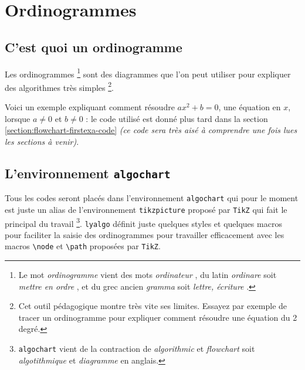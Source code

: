 \documentclass[12pt,a4paper]{article}
\theoremstyle{definition}
\newcommand\myquote[1]{{\itshape \og #1 \fg}}
\begin{document}
\section{Ordinogrammes}

\subsection{C'est quoi un ordinogramme} \label{section:flowchart-firstexa}

Les ordinogrammes
\footnote{
    Le mot \myquote{ordinogramme} vient des mots \myquote{ordinateur}, du latin \myquote{ordinare} soit \myquote{mettre en ordre}, et du grec ancien \myquote{gramma} soit \myquote{lettre, écriture}.
}
sont des diagrammes que l'on peut utiliser pour expliquer des algorithmes très simples
\footnote{
    Cet outil pédagogique montre très vite ses limites. Essayez par exemple de tracer un ordinogramme pour expliquer comment résoudre une équation du 2\ieme{} degré.
}.

\medskip


Voici un exemple expliquant comment résoudre $a x^2 + b = 0$, une équation en $x$, lorsque $a \neq 0$ et $b \neq 0$ : le code utilisé est donné plus tard dans la section \ref{section:flowchart-firstexa-code} \emph{(ce code sera très aisé à comprendre une fois lues les sections à venir)}.

\begin{center}
    \small
    
\end{center}




\subsection{L'environnement \texttt{algochart}}

Tous les codes seront placés dans l'environnement \verb+algochart+ qui pour le moment est juste un alias de l'environnement \verb+tikzpicture+ proposé par \verb+TikZ+ qui fait le principal du travail
\footnote{
	\texttt{algochart} vient de la contraction de \myquote{algorithmic} et \myquote{flowchart} soit \myquote{algotithmique} et \myquote{diagramme} en anglais.
}.
\verb+lyalgo+ définit juste quelques styles et quelques macros pour faciliter la saisie des ordinogrammes pour travailler efficacement avec les macros \verb+\node+ et \verb+\path+ proposées par \verb+TikZ+.


\end{document}
